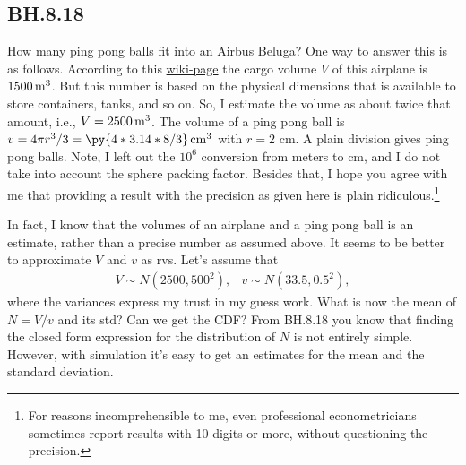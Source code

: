 \subsection{BH.8.18}







How many ping pong balls fit into an Airbus Beluga?
One way to answer this is as follows.
According to this \href{https://en.wikipedia.org/wiki/Airbus\_Beluga}{wiki-page} the cargo volume $V$ of this airplane is $1500 \,\mathrm{m}^{3}$.
But this number is based on the physical dimensions that is available to store containers, tanks, and so on.
So, I estimate the volume as about twice that amount, i.e., $V = 2500 \,\mathrm{m}^{3}$.
The volume of a ping pong ball is $v = 4 \pi r^3/3  = \py{4*3.14*8/3} \cm^{3}$ with $r=2$ cm.
A plain division gives  ping pong balls.
Note, I left out the $10^{6}$ conversion from meters to cm, and I do not take into  account the sphere packing factor.
Besides that, I hope you agree with me that providing a result with the precision as given here is plain ridiculous.\footnote{For reasons incomprehensible to me, even professional econometricians sometimes  report results with 10 digits or more, without questioning the precision.}


In fact, I know that the volumes of an airplane and a ping pong ball is an estimate, rather than a precise number as assumed above.
It seems to be better to approximate $V$ and $v$ as rvs.
Let's assume that
   \begin{align*}
V \sim N(2500, 500^{2}), & v \sim N(33.5, 0.5^{2}),
\end{align*}
where the variances express my trust in my guess work.
What is now the mean of $N = V/v$ and its std? Can we get the CDF?
From BH.8.18 you know that finding the closed form expression for the distribution of $N$ is not entirely simple.
However, with simulation it's easy to get an estimates for the mean and the standard deviation.


